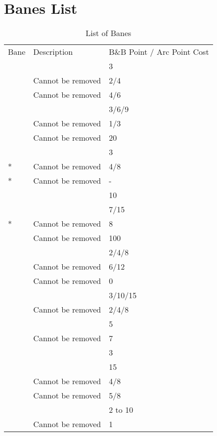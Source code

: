 \documentclass[oneside,11pt,english]{book}
\begin{document}
\section{Banes List}
\begin{table}[!ht]
	\caption{List of Banes}
	\label{tab:Banes List}
	\begin{tabu} to \linewidth {X X X}
		Bane&Description&B\&B Point / Arc Point Cost\\
	&&3\\
 		&Cannot be removed &2/4\\
 		&Cannot be removed &4/6\\
 &&3/6/9\\
 &Cannot be removed &1/3\\
 &Cannot be removed&20\\
 &&3\\
* &Cannot be removed &4/8\\
* &Cannot be removed& -\\
 &&10\\
 &&7/15\\
* &Cannot be removed &8\\
 &Cannot be removed &100\\
 &&2/4/8\\
 &Cannot be removed &6/12\\
 &Cannot be removed &0\\
 &&3/10/15\\
 &Cannot be removed &2/4/8\\
 &&5\\
 &Cannot be removed &7\\
 &&3\\
 &&15\\
 &Cannot be removed &4/8\\
 &Cannot be removed &5/8\\
 &&2 to 10\\
 &Cannot be removed &1\\

\end{tabu}
\end{table}
\end{document}
